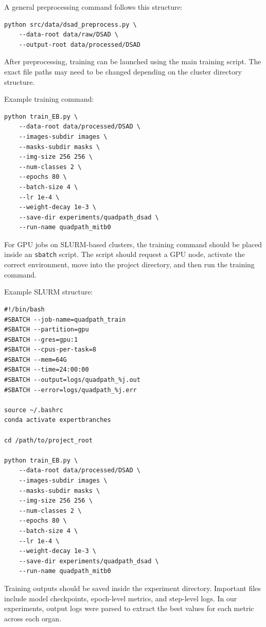 \documentclass[twocolumn]{article}
\begin{document}
A general preprocessing command follows this structure:

\begin{verbatim}
python src/data/dsad_preprocess.py \
    --data-root data/raw/DSAD \
    --output-root data/processed/DSAD
\end{verbatim}

After preprocessing, training can be launched using the main training script. The exact file paths may need to be changed depending on the cluster directory structure.

Example training command:

\begin{verbatim}
python train_EB.py \
    --data-root data/processed/DSAD \
    --images-subdir images \
    --masks-subdir masks \
    --img-size 256 256 \
    --num-classes 2 \
    --epochs 80 \
    --batch-size 4 \
    --lr 1e-4 \
    --weight-decay 1e-3 \
    --save-dir experiments/quadpath_dsad \
    --run-name quadpath_mitb0
\end{verbatim}

For GPU jobs on SLURM-based clusters, the training command should be placed inside an \texttt{sbatch} script. The script should request a GPU node, activate the correct environment, move into the project directory, and then run the training command.

Example SLURM structure:

\begin{verbatim}
#!/bin/bash
#SBATCH --job-name=quadpath_train
#SBATCH --partition=gpu
#SBATCH --gres=gpu:1
#SBATCH --cpus-per-task=8
#SBATCH --mem=64G
#SBATCH --time=24:00:00
#SBATCH --output=logs/quadpath_%j.out
#SBATCH --error=logs/quadpath_%j.err

source ~/.bashrc
conda activate expertbranches

cd /path/to/project_root

python train_EB.py \
    --data-root data/processed/DSAD \
    --images-subdir images \
    --masks-subdir masks \
    --img-size 256 256 \
    --num-classes 2 \
    --epochs 80 \
    --batch-size 4 \
    --lr 1e-4 \
    --weight-decay 1e-3 \
    --save-dir experiments/quadpath_dsad \
    --run-name quadpath_mitb0
\end{verbatim}

Training outputs should be saved inside the experiment directory. Important files include model checkpoints, epoch-level metrics, and step-level logs. In our experiments, output logs were parsed to extract the best values for each metric across each organ.
\end{document}
